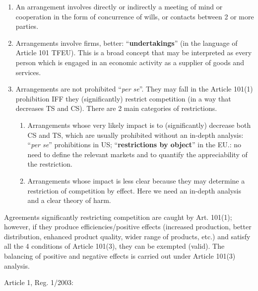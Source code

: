     \begin{enumerate}
        \item An arrangement involves directly or indirectly a meeting of mind or cooperation in the form of concurrence of wills, or contacts between 2 or more parties.
        \item Arrangements involve firms, better: “\textbf{undertakings}” (in the language of Article 101 TFEU). This is a broad concept that may be interpreted as every person which is engaged in an economic activity as a supplier of goods and services.
        \item Arrangements are not prohibited “\textit{per se}”. They may fall in the Article 101(1) prohibition IFF they (significantly) restrict competition (in a way that decreases TS and CS). There are 2 main categories of restrictions.
            \begin{enumerate}
                \item Arrangements whose very likely impact is to (significantly) decrease both CS and TS, which are usually prohibited without an in-depth analysis: “\textit{per se}” prohibitions in US; “\textbf{restrictions by object}” in the EU.: no need to define the relevant markets and to quantify the appreciability of the restriction.
                \item Arrangements whose impact is less clear because they may determine a restriction of competition by effect. Here we need an in-depth analysis and a clear theory of harm.
            \end{enumerate}
    \end{enumerate}

    Agreements significantly restricting competition are caught by Art. 101(1); however, if they produce efficiencies/positive effects (increased production, better distribution, enhanced product quality, wider range of products, etc.) and satisfy all the 4 conditions of Article 101(3), they can be exempted (valid). The balancing of positive and negative effects is carried out under Article 101(3) analysis. 
    
    Article 1, Reg. 1/2003: 

